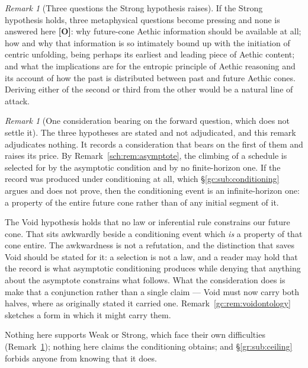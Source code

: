 \documentclass[11pt]{article}
\numberwithin{equation}{section}
\theoremstyle{plain}
\theoremstyle{definition}
\theoremstyle{remark}
\newtheorem{remark}[theorem]{Remark}
\begin{document}
\begin{remark}[Three questions the Strong hypothesis raises]
\label{gc:rem:strongquestions}
If the Strong hypothesis holds, three metaphysical questions become
pressing and none is answered here \textbf{[O]}: why future-cone Aethic
information should be available at all; how and why that information is
so intimately bound up with the initiation of centric unfolding, being
perhaps its earliest and leading piece of Aethic content; and what the
implications are for the entropic principle of Aethic reasoning and its
account of how the past is distributed between past and future Aethic
cones. Deriving either of the second or third from the other would be a
natural line of attack.
\end{remark}

\begin{remark}[One consideration bearing on the forward question, which
does not settle it]\label{gc:rem:asymptoteextrap}
The three hypotheses are stated and not adjudicated, and this remark
adjudicates nothing. It records a consideration that bears on the first
of them and raises its price. By Remark~\ref{sch:rem:asymptote}, the climbing of a schedule is
selected for by the asymptotic condition and by no finite-horizon one.
If the record was produced under conditioning at all, which
\S\ref{gc:sub:conditioning} argues and does not prove, then the
conditioning event is an infinite-horizon one: a property of the entire
future cone rather than of any initial segment of it.

The Void hypothesis holds that no law or inferential rule constrains our
future cone. That sits awkwardly beside a conditioning event which
\emph{is} a property of that cone entire. The awkwardness is not a
refutation, and the distinction that saves Void should be stated for it:
a selection is not a law, and a reader may hold that the record is what
asymptotic conditioning produces while denying that anything about the
asymptote constrains what follows. What the consideration does is make
that a conjunction rather than a single claim --- Void must now carry
both halves, where as originally stated it carried one.
Remark~\ref{gc:rem:voidontology} sketches a form in which it might carry
them.

Nothing here supports Weak or Strong, which face their own difficulties
(Remark~\ref{gc:rem:strongquestions}); nothing here claims the
conditioning obtains; and \S\ref{gr:sub:ceiling} forbids anyone from
knowing that it does.
\end{remark}
\end{document}
